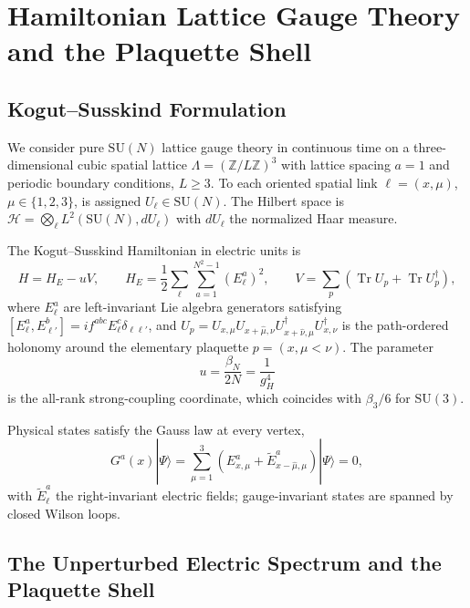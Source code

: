 \documentclass[11pt,a4paper]{article}
\theoremstyle{definition}
\DeclareMathOperator{\Tr}{Tr}
\newcommand{\Z}{\mathbb{Z}}
\newcommand{\dg}{^{\dagger}}
\newcommand{\SU}{\mathrm{SU}}
\begin{document}
\section{Hamiltonian Lattice Gauge Theory and the Plaquette Shell}\label{sec:hamiltonian}

\subsection{Kogut--Susskind Formulation}

We consider pure $\SU(N)$ lattice gauge theory in continuous time on a three-dimensional cubic spatial lattice $\Lambda = (\Z/L\Z)^3$ with lattice spacing $a=1$ and periodic boundary conditions, $L\ge 3$. To each oriented spatial link $\ell = (x,\mu)$, $\mu\in\{1,2,3\}$, is assigned $U_\ell \in \SU(N)$. The Hilbert space is $\mathcal{H} = \bigotimes_\ell L^2(\SU(N), dU_\ell)$ with $dU_\ell$ the normalized Haar measure.

The Kogut--Susskind Hamiltonian \cite{KogutSusskind1975} in electric units is
\begin{equation}\label{eq:H_KS}
  H = H_E - u V, \qquad
  H_E = \frac{1}{2}\sum_\ell \sum_{a=1}^{N^2-1}(E^a_\ell)^2, \qquad
  V = \sum_p\left(\Tr U_p + \Tr U_p\dg\right),
\end{equation}
where $E^a_\ell$ are left-invariant Lie algebra generators satisfying $[E^a_\ell, E^b_{\ell'}] = i f^{abc}E^c_\ell \delta_{\ell\ell'}$, and $U_p = U_{x,\mu}U_{x+\hat\mu,\nu}U\dg_{x+\hat\nu,\mu}U\dg_{x,\nu}$ is the path-ordered holonomy around the elementary plaquette $p = (x,\mu<\nu)$. The parameter
\begin{equation}\label{eq:u_def}
  u = \frac{\beta_N}{2N} = \frac{1}{g_H^4}
\end{equation}
is the all-rank strong-coupling coordinate, which coincides with $\beta_3/6$ for $\SU(3)$.

Physical states satisfy the Gauss law at every vertex,
\begin{equation}\label{eq:gauss_law}
  G^a(x)|\Psi\rangle = \sum_{\mu=1}^3\left(E^a_{x,\mu} + \tilde E^a_{x-\hat\mu,\mu}\right)|\Psi\rangle = 0,
\end{equation}
with $\tilde E^a_\ell$ the right-invariant electric fields; gauge-invariant states are spanned by closed Wilson loops.

\subsection{The Unperturbed Electric Spectrum and the Plaquette Shell}
\end{document}

